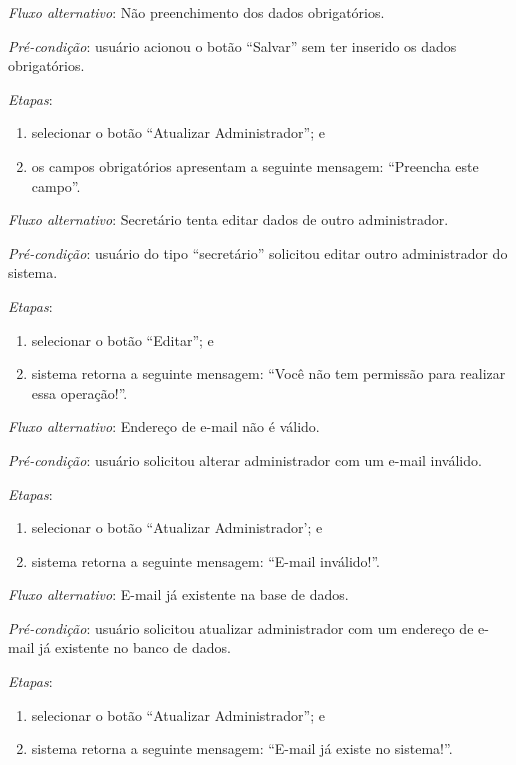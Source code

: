 \noindent \textit{Fluxo alternativo}: Não preenchimento dos dados obrigatórios.

\noindent \textit{Pré-condição}: usuário acionou o botão ``Salvar'' sem ter inserido os dados obrigatórios.

\noindent \textit{Etapas}:

\begin{enumerate}
    \item selecionar o botão ``Atualizar Administrador''; e
    \item os campos obrigatórios apresentam a seguinte mensagem: ``Preencha este campo''.
\end{enumerate}



\noindent \textit{Fluxo alternativo}: Secretário tenta editar dados de outro administrador.

\noindent \textit{Pré-condição}: usuário do tipo ``secretário'' solicitou editar outro administrador do sistema.

\noindent \textit{Etapas}:

\begin{enumerate}
    \item selecionar o botão ``Editar''; e
    \item sistema retorna a seguinte mensagem: ``Você não tem permissão para realizar essa operação!''.
\end{enumerate}


\noindent \textit{Fluxo alternativo}: Endereço de e-mail não é válido.

\noindent \textit{Pré-condição}: usuário solicitou alterar administrador com um e-mail inválido.

\noindent \textit{Etapas}:

\begin{enumerate}
    \item selecionar o botão ``Atualizar Administrador'; e
    \item sistema retorna a seguinte mensagem: ``E-mail inválido!''.
\end{enumerate}


\noindent \textit{Fluxo alternativo}: E-mail já existente na base de dados.

\noindent \textit{Pré-condição}: usuário solicitou atualizar administrador com um endereço de e-mail já existente no banco de dados.

\noindent \textit{Etapas}:

\begin{enumerate}
    \item selecionar o botão ``Atualizar Administrador''; e
    \item sistema retorna a seguinte mensagem: ``E-mail já existe no sistema!''.
\end{enumerate}


